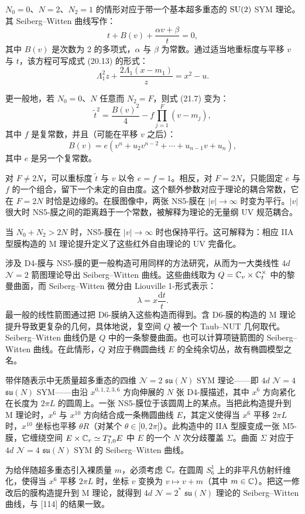 \begin{example}[21.11] $N_0=0$、$N=2$、$N_2=1$ 的情形对应于带一个基本超多重态的 $\operatorname{SU}(2)$ SYM 理论。其 Seiberg–Witten 曲线写作：
\[
t+B(v)+\frac{\alpha v+\beta}{t}=0,
\]
其中 $B(v)$ 是次数为 2 的多项式，$\alpha$ 与 $\beta$ 为常数。通过适当地重标度与平移 $v$ 与 $t$，该方程可写成式 (20.13) 的形式：
\[
\Lambda_1^2z+\frac{2\Lambda_1(x-m_1)}{z}=x^2-u.
\]
\end{example}

\begin{example}[21.12] 更一般地，若 $N_0=0$、$N$ 任意而 $N_2=F$，则式 (21.7) 变为：
\[
\tilde t^2=\frac{B(v)^2}{4}-f\prod_{j=1}^{F}(v-m_j),
\]
其中 $f$ 是复常数，并且（可能在平移 $v$ 之后）：
\[
B(v)=e(v^n+u_2v^{n-2}+\cdots+u_{n-1}v+u_n),
\]
其中 $e$ 是另一个复常数。

对 $F\ne 2N$，可以重标度 $\tilde t$ 与 $v$ 以令 $e=f=1$。相反，对 $F=2N$，只能固定 $e$ 与 $f$ 的一个组合，留下一个未定的自由度。这个额外参数对应于理论的耦合常数，它在
$F=2N$ 时恰是边缘的。在膜图像中，两张 NS5-膜在 $|v|\to\infty$ 时变为平行。$|v|$ 很大时 NS5-膜之间的距离趋于一个常数，被解释为理论的无量纲 UV 规范耦合。\end{example}

\begin{remark}[21.13] 当 $N_0+N_2>2N$ 时，NS5-膜在 $|v|\to\infty$ 时也保持平行。这可解释为：相应 IIA 型膜构造的 M 理论提升定义了这些红外自由理论的 UV 完备化。\end{remark}

涉及 D4-膜与 NS5-膜的更一般构造可用同样的方法研究，从而为一大类线性 $4d$ $\mathcal{N}=2$ 箭图理论导出 Seiberg–Witten 曲线。这些曲线取为 $Q=\mathbb{C}_v\times\mathbb{C}^\times_t$ 中的黎曼曲面，而 Seiberg–Witten 微分由 Liouville 1-形式表示：
\[
\lambda=x\frac{\mathrm{d}t}{t}.
\]
最一般的线性箭图通过把 D6-膜纳入这些构造而得到。含 D6-膜的构造的 M 理论提升导致更复杂的几何，具体地说，复空间 $Q$ 被一个 Taub–NUT 几何取代。Seiberg–Witten 曲线仍是 $Q$ 中的一条黎曼曲面。也可以计算项链箭图的 Seiberg–Witten 曲线。在此情形，$Q$ 对应于椭圆曲线 $E$ 的全纯余切丛，故有椭圆模型之名。

\begin{example}[21.14] 带伴随表示中无质量超多重态的四维 $\mathcal{N}=2$ $\mathfrak{su}(N)$ SYM 理论——即 $4d$ $\mathcal{N}=4$ $\mathfrak{su}(N)$ SYM——由沿 $x^{0,1,2,3,6}$ 方向伸展的 $N$ 张 D4-膜描述，其中 $x^6$ 方向紧化在长度为 $2\pi L$ 的圆周上。一张 NS5-膜位于该圆周上的某点。当把此构造提升到 M 理论时，$x^6$ 与 $x^{10}$ 方向结合成一条椭圆曲线 $E$，其定义使得当 $x^6$ 平移 $2\pi L$ 时，$x^{10}$ 坐标也平移 $\theta R$（对某个 $\theta\in[0,2\pi[$）。此构造中的 IIA 型膜变成一张 M5-膜，它缠绕空间 $E\times\mathbb{C}_v\simeq T^*_{1,0}E$ 中 $E$ 的一个 $N$ 次分歧覆盖 $\Sigma$。曲面 $\Sigma$ 对应于 $4d$ $\mathcal{N}=4$ $\mathfrak{su}(N)$ SYM 的 Seiberg–Witten 曲线。

为给伴随超多重态引入裸质量 $m$，必须考虑 $\mathbb{C}_v$ 在圆周 $S^1_6$ 上的非平凡仿射纤维化，使得当 $x^6$ 平移 $2\pi L$ 时，坐标 $v$ 变换为 $v\mapsto v+m$（其中 $m\in\mathbb{C}$）。把这一修改后的膜构造提升到 M 理论，就得到 $4d$ $\mathcal{N}=2^*$ $\mathfrak{su}(N)$ 理论的 Seiberg–Witten 曲线，与 [114] 的结果一致。\end{example}

